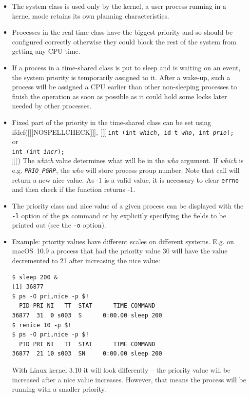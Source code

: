 \begin{itemize}
\item The system class is used only by the kernel, a user process running
in a kernel mode retains its own planning characteristics.
\item Processes in the real time class have the biggest priority and so should
be configured correctly otherwise they could block the rest of the system from
getting any CPU time.
\item If a process in a time-shared class is put to sleep and is waiting on an
event, the system priority is temporarily assigned to it.  After a wake-up, such
a process will be assigned a CPU earlier than other non-sleeping processes to
finish the operation as soon as possible as it could hold some locks later
needed by other processes.
\item Fixed part of the priority in the time-shared class can be set using\\
ifdef([[[NOSPELLCHECK]]], [[[
\texttt{int (int \emph{which}, id\_t \emph{who},
int \emph{prio});}\\ or \\ \texttt{int (int \emph{in{}cr});} \\
]]])
The \emph{which} value determines what will be in the \emph{who} argument.
If \emph{which} is e.g. \emph{\texttt{PRIO\_PGRP}}, the \emph{who} will store
process group number.  Note that  call will return a new nice value.
As -1 is a valid value, it is necessary to clear \texttt{errno} and then check
if the function returns -1.
\item The priority class and nice value of a given process can be displayed with
the \texttt{-l} option of the \texttt{ps} command or by explicitly specifying
the fields to be printed out (see the \texttt{-o} option).
\item Example: priority values have different scales on different systems.  E.g.
on macOS~10.9 a process that had the priority value 30 will have the value
decremented to 21 after increasing the nice value:
\begin{verbatim}
$ sleep 200 &
[1] 36877
$ ps -O pri,nice -p $!
  PID PRI NI   TT  STAT      TIME COMMAND
36877  31  0 s003  S      0:00.00 sleep 200
$ renice 10 -p $!
$ ps -O pri,nice -p $!
  PID PRI NI   TT  STAT      TIME COMMAND
36877  21 10 s003  SN     0:00.00 sleep 200
\end{verbatim}

With Linux kernel 3.10 it will look differently -- the priority value will be
increased after a nice value increases.  However, that means the process will be
running with a smaller priority.
\end{itemize}

